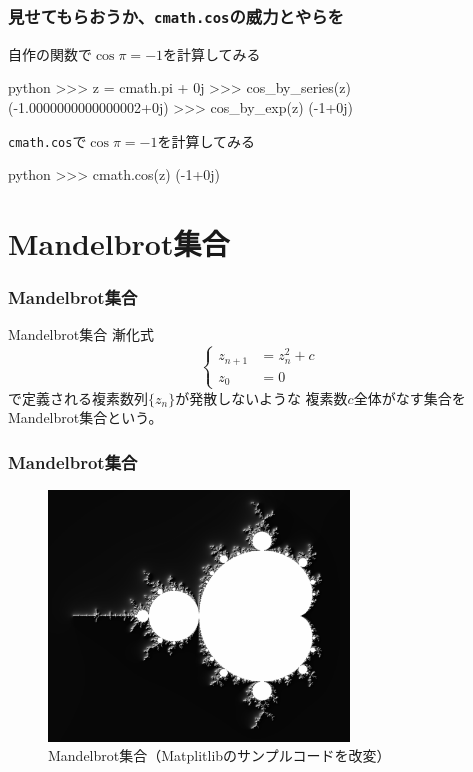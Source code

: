 \documentclass[dvipdfmx,11pt,notheorems]{beamer}
\theoremstyle{definition}
\begin{document}
\begin{frame}[fragile]\frametitle{見せてもらおうか、\texttt{cmath.cos}の威力とやらを}
\begin{exampleblock}{自作の関数で$\cos{\pi} = -1$を計算してみる}
\begin{pygments}{python}
>>> z = cmath.pi + 0j
>>> cos_by_series(z)
(-1.0000000000000002+0j)
>>> cos_by_exp(z)
(-1+0j)
\end{pygments}
\end{exampleblock}

\begin{exampleblock}{\texttt{cmath.cos}で$\cos{\pi} = -1$を計算してみる}
\begin{pygments}{python}
>>> cmath.cos(z)
(-1+0j)
\end{pygments}
\end{exampleblock}

\end{frame}


\section{Mandelbrot集合}

\begin{frame}[fragile]\frametitle{Mandelbrot集合}

\begin{block}{Mandelbrot集合}
漸化式
\begin{equation*}
    \left\{
    \begin{alignedat}{4}
          z_{n+1} &= z^{2}_{n} +c \\
          z_{0} &= 0
    \end{alignedat}
    \right.
\end{equation*}
で定義される複素数列$\{z_{n}\}$が発散しないような
複素数$c$全体がなす集合をMandelbrot集合という。
\end{block}

\end{frame}

\begin{frame}[fragile]\frametitle{Mandelbrot集合}

\begin{figure}
  \centering
  \includegraphics[width=8cm]{mandelbrot.png}
  \caption{Mandelbrot集合（Matplitlibのサンプルコードを改変）}
\end{figure}

\end{frame}
\end{document}
